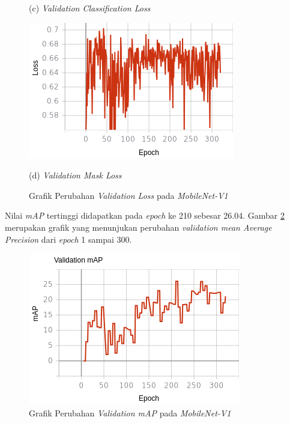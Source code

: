 \begin{figure}[H]
\begin{minipage}{0.45\textwidth}
		\caption*{(c) \textit{Validation Classification Loss}}
	\end{minipage}
	\hfill
	\begin{minipage}{0.45\textwidth}
		\includegraphics[width=\textwidth]{gambar/training_resnet50/tugas-akhir-Page 19 (3).png}
		\caption*{(d) \textit{Validation Mask Loss}}
	\end{minipage}
	\caption{Grafik Perubahan \textit{Validation Loss} pada \textit{MobileNet-V1}}
	\label{fig:mobilenetv1-val}
\end{figure}

Nilai \textit{mAP} tertinggi didapatkan pada \textit{epoch} ke 210 sebesar 26.04. Gambar \ref{fig:mobilenetv1-map} merupakan grafik yang menunjukan perubahan \textit{validation mean Average Precision} dari \textit{epoch} 1 sampai 300.

\newpage

\begin{figure}[h]
	\centering
	\includegraphics[scale=0.4]{gambar/mobilenetv1-map.png}
	\caption{Grafik Perubahan \textit{Validation mAP} pada \textit{MobileNet-V1}}
	\label{fig:mobilenetv1-map}
\end{figure} 

